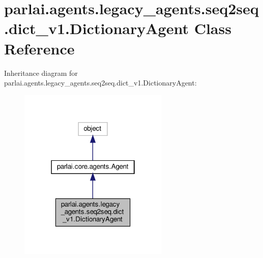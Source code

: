 \hypertarget{classparlai_1_1agents_1_1legacy__agents_1_1seq2seq_1_1dict__v1_1_1DictionaryAgent}{}\section{parlai.\+agents.\+legacy\+\_\+agents.\+seq2seq.\+dict\+\_\+v1.\+Dictionary\+Agent Class Reference}
\label{classparlai_1_1agents_1_1legacy__agents_1_1seq2seq_1_1dict__v1_1_1DictionaryAgent}


Inheritance diagram for parlai.\+agents.\+legacy\+\_\+agents.\+seq2seq.\+dict\+\_\+v1.\+Dictionary\+Agent\+:
\nopagebreak
\begin{figure}[H]
\begin{center}
\leavevmode
\includegraphics[width=202pt]{dd/d9a/classparlai_1_1agents_1_1legacy__agents_1_1seq2seq_1_1dict__v1_1_1DictionaryAgent__inherit__graph}
\end{center}
\end{figure}


